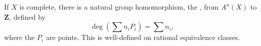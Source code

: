 If $X$ is complete, there is a natural group homomorphism, the , from $A^n(X)$ to $\mathbf{Z}$, defined by
$$\deg\left(\sum n_i P_i\right) = \sum n_i,$$
where the $P_i$ are points. This is well-defined on rational equivalence classes.
